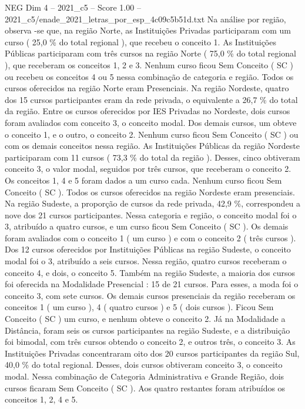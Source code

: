 \begin{textsample}{NEG Dim 4 – 2021\_c5 – Score 1.00 – 2021\_c5/enade\_2021\_letras\_por\_esp\_4c09c5b51d.txt}
Na análise por região, observa -se que, na região Norte, as Instituições Privadas participaram com um curso ( 25,0 \% do total regional ), que recebeu o conceito 1.
As Instituições Públicas participaram com três cursos na região Norte ( 75,0 \% do total regional ), que receberam os conceitos 1, 2 e 3.
Nenhum curso ficou Sem Conceito ( SC ) ou recebeu os conceitos 4 ou 5 nessa combinação de categoria e região.
Todos os cursos oferecidos na região Norte eram Presenciais.
Na região Nordeste, quatro dos 15 cursos participantes eram da rede privada, o equivalente a 26,7 \% do total da região.
Entre os cursos oferecidos por IES Privadas no Nordeste, dois cursos foram avaliados com conceito 3, o conceito modal.
Dos demais cursos, um obteve o conceito 1, e o outro, o conceito 2.
Nenhum curso ficou Sem Conceito ( SC ) ou com os demais conceitos nessa região.
As Instituições Públicas da região Nordeste participaram com 11 cursos ( 73,3 \% do total da região ).
Desses, cinco obtiveram conceito 3, o valor modal, seguidos por três cursos, que receberam o conceito 2.
Os conceitos 1, 4 e 5 foram dados a um curso cada.
Nenhum curso ficou Sem Conceito ( SC ).
Todos os cursos oferecidos na região Nordeste eram presenciais.
Na região Sudeste, a proporção de cursos da rede privada, 42,9 \%, correspondeu a nove dos 21 cursos participantes.
Nessa categoria e região, o conceito modal foi o 3, atribuído a quatro cursos, e um curso ficou Sem Conceito ( SC ).
Os demais foram avaliados com o conceito 1 ( um curso ) e com o conceito 2 ( três cursos ).
Dos 12 cursos oferecidos por Instituições Públicas na região Sudeste, o conceito modal foi o 3, atribuído a seis cursos.
Nessa região, quatro cursos receberam o conceito 4, e dois, o conceito 5.
Também na região Sudeste, a maioria dos cursos foi oferecida na Modalidade Presencial : 15 de 21 cursos.
Para esses, a moda foi o conceito 3, com sete cursos.
Os demais cursos presenciais da região receberam os conceitos 1 ( um curso ), 4 ( quatro cursos ) e 5 ( dois cursos ).
Ficou Sem Conceito ( SC ) um curso, e nenhum obteve o conceito 2.
Já na Modalidade a Distância, foram seis os cursos participantes na região Sudeste, e a distribuição foi bimodal, com três cursos obtendo o conceito 2, e outros três, o conceito 3.
As Instituições Privadas concentraram oito dos 20 cursos participantes da região Sul, 40,0 \% do total regional.
Desses, dois cursos obtiveram conceito 3, o conceito modal.
Nessa combinação de Categoria Administrativa e Grande Região, dois cursos ficaram Sem Conceito ( SC ).
Aos quatro restantes foram atribuídos os conceitos 1, 2, 4 e 5.

\end{textsample}
